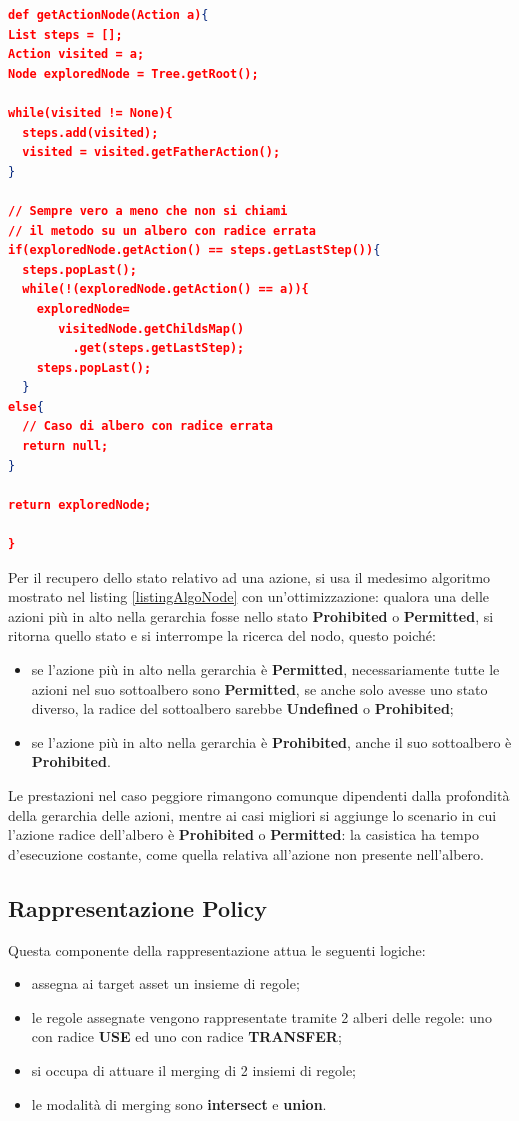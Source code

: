 \documentclass[12pt,a4paper,twoside]{book}
\begin{document}
\begin{lstlisting}[language=Json,firstnumber=1,caption={Il caso peggiore per questa ricerca è la profondità della gerarchia delle azioni. Il caso migliore si ha qundo l'azione non è nell'albero, con tempo di risposta costante.},label=listingAlgoNode,captionpos=b]
def getActionNode(Action a){
List steps = [];
Action visited = a;
Node exploredNode = Tree.getRoot();

while(visited != None){
  steps.add(visited);
  visited = visited.getFatherAction();
}

// Sempre vero a meno che non si chiami
// il metodo su un albero con radice errata
if(exploredNode.getAction() == steps.getLastStep()){
  steps.popLast();
  while(!(exploredNode.getAction() == a)){
  	exploredNode=
  	   visitedNode.getChildsMap()
  	     .get(steps.getLastStep);
  	steps.popLast();
  }
else{
  // Caso di albero con radice errata
  return null; 
}

return exploredNode;
                
}
\end{lstlisting}
Per il recupero dello stato relativo ad una azione, si usa il medesimo algoritmo mostrato nel listing \ref{listingAlgoNode} con un'ottimizzazione: qualora una delle azioni più in alto nella gerarchia fosse nello stato \textbf{Prohibited} o \textbf{Permitted}, si ritorna quello stato e si interrompe la ricerca del nodo, questo poiché:
\begin{itemize}
\item se l'azione più in alto nella gerarchia è \textbf{Permitted}, necessariamente tutte le azioni nel suo sottoalbero sono \textbf{Permitted}, se anche solo avesse uno stato diverso, la radice del sottoalbero sarebbe \textbf{Undefined} o \textbf{Prohibited};
\item  se l'azione più in alto nella gerarchia è \textbf{Prohibited}, anche il suo sottoalbero è \textbf{Prohibited}.
\end{itemize}
Le prestazioni nel caso peggiore rimangono comunque dipendenti dalla profondità della gerarchia delle azioni, mentre ai casi migliori si aggiunge lo scenario in cui l'azione radice dell'albero è \textbf{Prohibited} o \textbf{Permitted}: la casistica ha tempo d'esecuzione costante, come quella relativa all'azione non presente nell'albero.
\subsection{Rappresentazione Policy}\label{policyRappr}
Questa componente della rappresentazione attua le seguenti logiche:
\begin{itemize}
\item assegna ai target asset un insieme di regole;
\item le regole assegnate vengono rappresentate tramite 2 alberi delle regole: uno con radice \textbf{USE} ed uno con radice \textbf{TRANSFER};
\item si occupa di attuare il merging di 2 insiemi di regole;
\item le modalità di merging sono \textbf{intersect} e \textbf{union}.
\end{itemize}
\end{document}
